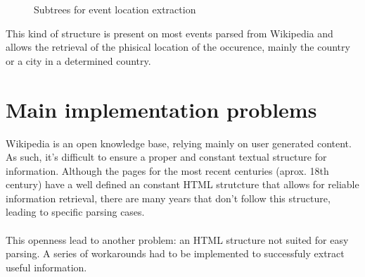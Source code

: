 \documentclass{llncs}
\begin{document}
\begin{figure}[h]
	\centering
	\hspace{20mm}
	\caption{Subtrees for event location extraction}
	\label{fig:location-extraction}
\end{figure}

This kind of structure is present on most events parsed from Wikipedia and allows the retrieval of the phisical location of the occurence, mainly the country or a city in a determined country.

%
\section{Main implementation problems}

Wikipedia is an open knowledge base, relying mainly on user generated content. As such, it's difficult to ensure a proper and constant textual structure for information. Although the pages for the most recent centuries (aprox. 18th century) have a well defined an constant HTML strutcture that allows for reliable information retrieval, there are many years that don't follow this structure, leading to specific parsing cases.\\
\ \\
This openness lead to another problem: an HTML structure not suited for easy parsing. A series of workarounds had to be implemented to successfuly extract useful information.
\end{document}
